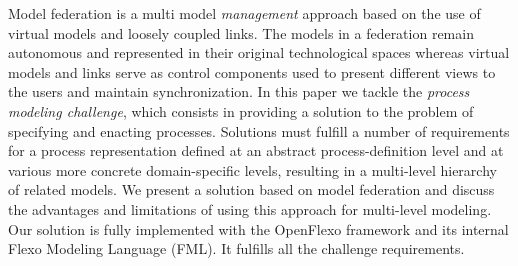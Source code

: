Model federation is a multi model \emph{management} approach based on the use of virtual models and loosely coupled links. The models in a federation remain autonomous and represented in their original technological spaces whereas virtual models and links serve as control components used to present different views to the users and  maintain synchronization. In this paper we tackle the \emph{process modeling challenge}, which consists in providing a solution to the problem of specifying and enacting processes. Solutions must fulfill a number of requirements for a process representation defined at an abstract process-definition level and at various more concrete domain-specific levels, resulting in a multi-level hierarchy of related models. We present a solution based on model federation and discuss the advantages and limitations of using this approach for multi-level modeling. Our solution is fully implemented with the OpenFlexo framework and its internal Flexo Modeling Language (FML). It fulfills all the challenge requirements.






